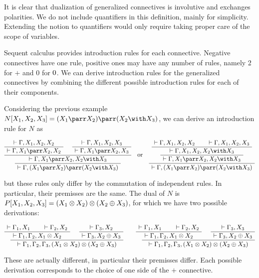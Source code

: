 It is clear that dualization of generalized connectives is involutive
and exchanges polarities. We do not include quantifiers in this
definition, mainly for simplicity. Extending the notion to quantifiers
would only require taking proper care of the scope of variables.

Sequent calculus provides introduction rules for each connective.
Negative connectives have one rule, positive ones may have any number of
rules, namely 2 for \(\plus\) and 0 for \(0\). We can derive
introduction rules for the generalized connectives by combining the
different possible introduction rules for each of their components.

Considering the previous example
\(N[X_1,X_2,X_3]=(X_1\parr X_2)\parr(X_2\with X_3)\), we can derive an
introduction rule for \(N\) as

\(\AxRule{ \vdash \Gamma, X_1, X_2, X_2 }
  \UnaRule{ \vdash \Gamma, X_1\parr X_2, X_2 }
  \AxRule{ \vdash \Gamma, X_1, X_2, X_3 }
  \UnaRule{ \vdash \Gamma, X_1\parr X_2, X_3 }
  \BinRule{ \vdash \Gamma, X_1\parr X_2, X_2\with X_3 }
  \UnaRule{ \vdash \Gamma, (X_1\parr X_2)\parr(X_2\with X_3) }
  \DisplayProof
\quad\text{or}\quad
  \AxRule{ \vdash \Gamma, X_1, X_2, X_2 }
  \AxRule{ \vdash \Gamma, X_1, X_2, X_3 }
  \BinRule{ \vdash \Gamma, X_1, X_2, X_2\with X_3 }
  \UnaRule{ \vdash \Gamma, X_1\parr X_2, X_2\with X_3 }
  \UnaRule{ \vdash \Gamma, (X_1\parr X_2)\parr(X_2\with X_3) }
  \DisplayProof\)

but these rules only differ by the commutation of independent rules. In
particular, their premisses are the same. The dual of \(N\) is
\(P[X_1,X_2,X_3]=(X_1\otimes X_2)\otimes(X_2\oplus X_3)\), for which we have
two possible derivations:

\(\AxRule{ \vdash \Gamma_1, X_1 }
  \AxRule{ \vdash \Gamma_2, X_2 }
  \BinRule{ \vdash \Gamma_1, \Gamma_2, X_1\tens X_2 }
  \AxRule{ \vdash \Gamma_3, X_2 }
  \UnaRule{ \vdash \Gamma_3, X_2\plus X_3 }
  \BinRule{ \vdash \Gamma_1, \Gamma_2, \Gamma_3, (X_1\tens X_2)\tens(X_2\plus X_3) }
  \DisplayProof
\qquad
  \AxRule{ \vdash \Gamma_1, X_1 }
  \AxRule{ \vdash \Gamma_2, X_2 }
  \BinRule{ \vdash \Gamma_1, \Gamma_2, X_1\tens X_2 }
  \AxRule{ \vdash \Gamma_3, X_3 }
  \UnaRule{ \vdash \Gamma_3, X_2\plus X_3 }
  \BinRule{ \vdash \Gamma_1, \Gamma_2, \Gamma_3, (X_1\tens X_2)\tens(X_2\plus X_3) }
  \DisplayProof\)

These are actually different, in particular their premisses differ. Each
possible derivation corresponds to the choice of one side of the
\(\plus\) connective.

